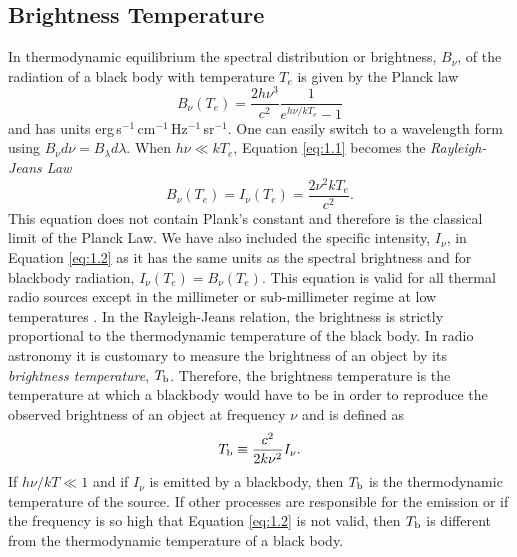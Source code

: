 \subsection{Brightness Temperature}\label{sec:1.8.1}
In thermodynamic equilibrium the spectral distribution or brightness, $B_{\nu}$, of the radiation of a black body with temperature $T_{e}$ is given by the Planck law
\begin{equation}\label{eq:1.1}
B_{\nu}(T_{e})=\frac{2h\nu ^3}{c^2}\frac{1}{e^{h\nu /kT_{e}}-1}
\end{equation}
and has units erg\,s$^{-1}$\,cm$^{-1}$\,Hz$^{-1}$\,sr$^{-1}$. One can easily switch to a wavelength form using  $B_{\nu}d\nu = B_{\lambda}d\lambda$. When $h\nu  \ll kT_{e}$, Equation \ref{eq:1.1} becomes the \textit{Rayleigh-Jeans Law}
\begin{equation}
\label{eq:1.2}
B_{\nu}(T_{e})=I_{\nu}(T_{e})=\dfrac{2\nu ^2kT_{e}}{c^2}.
\end{equation}
This equation does not contain Plank's constant and therefore is the classical limit of the Planck Law. We have also included the specific intensity, $I_{\nu}$, in Equation \ref{eq:1.2} as it has the same units as the spectral brightness and for blackbody radiation, $I_{\nu}(T_{e}) = B_{\nu}(T_{e})$. This equation is valid for all thermal radio sources except in the millimeter or sub-millimeter regime at low temperatures \citep{rohlfs_1996}. In the Rayleigh-Jeans relation, the brightness is strictly proportional to the thermodynamic temperature of the black body. In radio astronomy it is customary to measure the brightness of an object by its \textit{brightness temperature}, $T_{\rm{b}}$. Therefore, the brightness temperature is the temperature at which a blackbody would have to be in order to reproduce the observed brightness of an object at frequency $\nu$ and is defined as
\begin{equation}\label{eq:1.3}
T_{\rm{b}}\equiv \frac{c^2}{2k\nu ^2}I_{\nu}. 
\end{equation}
If $h\nu /kT \ll 1$ and if $I_{\nu}$ is emitted by a blackbody, then $T_{\rm{b}}$ is the thermodynamic temperature of the source. If other processes are responsible for the emission or if the frequency is so high that Equation \ref{eq:1.2} is not valid, then $T_{\rm{b}}$ is different from the thermodynamic temperature of a black body.

